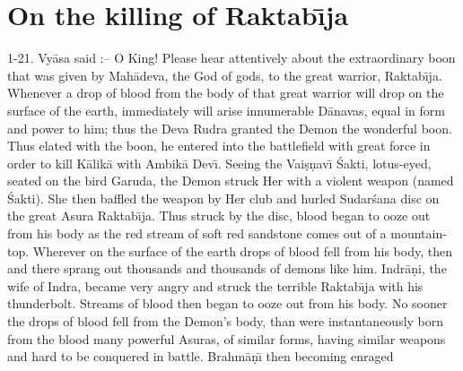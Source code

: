 \chapter{On the killing of Raktab\={\i}ja}

1-21. Vy\=asa said :-- O King! Please hear attentively about the extraordinary boon that was given by Mah\=adeva, the God of gods, to the great warrior, Raktab\={\i}ja. Whenever a drop of blood from the body of that great warrior will drop on the surface of the earth, immediately will arise innumerable D\=anavas, equal in form and power to him; thus the Deva Rudra granted the Demon the wonderful boon. Thus elated with the boon, he entered into the battlefield with great force in order to kill K\=alik\=a with Ambik\=a Dev\={\i}. Seeing the Vai\d{s}\d{n}av\={\i} \'Sakti, lotus-eyed, seated on the bird Garuda, the Demon struck Her with a violent weapon (named \'Sakti). She then baffled the weapon by Her club and hurled Sudar\'sana disc on the great Asura Raktab\={\i}ja. Thus struck by the disc, blood began to ooze out from his body as the red stream of soft red sandstone comes out of a mountain-top. Wherever on the surface of the earth drops of blood fell from his body, then and there sprang out thousands and thousands of demons like him. Indr\=a\d{n}i, the wife of Indra, became very angry and struck the terrible Raktab\={\i}ja with his thunderbolt. Streams of blood then began to ooze out from his body. No sooner the drops of blood fell from the Demon's body, than were instantaneously born from the blood many powerful Asuras, of similar forms, having similar weapons and hard to be conquered in battle. Brahm\=a\d{n}\={\i} then becoming enraged

